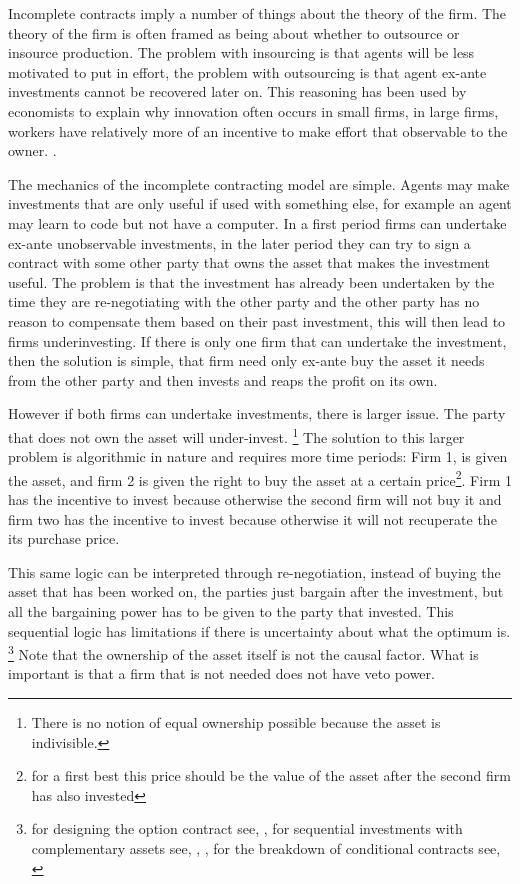 \documentclass[12pt]{article}
\numberwithin{equation}{section}
\begin{document}
Incomplete contracts imply a number of things about the theory of the firm. The theory of the firm is often framed as being about whether to outsource or insource production. The problem with insourcing is that agents will be less motivated to put in effort, the problem with outsourcing is that agent ex-ante investments cannot be recovered later on. This reasoning has been used by economists to explain why innovation often occurs in small firms, in large firms, workers have relatively more of an incentive to make effort that observable to the owner. \cite{Holmstrom1989}.

The mechanics of the incomplete contracting model are simple. Agents may make investments that are only useful if used with something else, for example an agent may learn to code but not have a computer. In a first period firms can undertake ex-ante unobservable investments, in the later period they can try to sign a contract with some other party that owns the asset that makes the investment useful. The problem is that the investment has already been undertaken by the time they are re-negotiating with the other party and the other party has no reason to compensate them based on their past investment, this will then lead to firms underinvesting. If there is only one firm that can undertake the investment, then the solution is simple, that firm need only ex-ante buy the asset it needs from the other party and then invests and reaps the profit on its own.

However if both firms can undertake investments, there is larger issue. The party that does not own the asset will under-invest. \footnote{There is no notion of equal ownership possible because the asset is indivisible.}  The solution to this larger problem is algorithmic in nature and requires more time periods: Firm 1, is given the asset, and firm 2 is given the right to buy the asset at a certain price\footnote{for a first best this price should be the value of the asset after the second firm has also invested}. Firm 1 has the incentive to invest because otherwise the second firm will not buy it and firm two has the incentive to invest because otherwise it will not recuperate the its purchase price.

This same logic can be interpreted through re-negotiation, instead of buying the asset that has been worked on, the parties just bargain after the investment, but all the bargaining power has to be given to the party that invested. This sequential logic has limitations if there is uncertainty about what the optimum is. \footnote{for designing the option contract see, \cite{Noldeke1998}, for sequential investments with complementary assets see, \cite{Zhang2014},\cite{bessen_maskin} , for the breakdown of conditional contracts see, \cite{Maskin1999}} Note that the ownership of the asset itself is not the causal factor. What is important is that a firm that is not needed does not have veto power.
\end{document}
